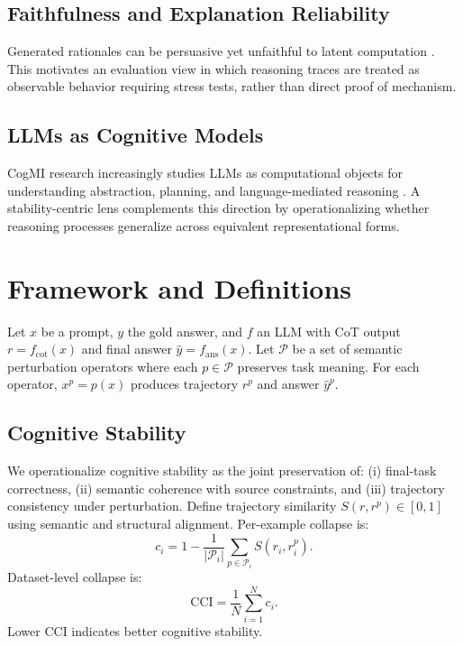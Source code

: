\documentclass[conference]{IEEEtran}
\begin{document}
\subsection{Faithfulness and Explanation Reliability}
Generated rationales can be persuasive yet unfaithful to latent computation \cite{turpin2023unfaithful,lanham2023faithful}. This motivates an evaluation view in which reasoning traces are treated as observable behavior requiring stress tests, rather than direct proof of mechanism.

\subsection{LLMs as Cognitive Models}
CogMI research increasingly studies LLMs as computational objects for understanding abstraction, planning, and language-mediated reasoning \cite{binz2023using,bubeck2023sparks}. A stability-centric lens complements this direction by operationalizing whether reasoning processes generalize across equivalent representational forms.

\section{Framework and Definitions}
Let $x$ be a prompt, $y$ the gold answer, and $f$ an LLM with CoT output $r=f_{\mathrm{cot}}(x)$ and final answer $\hat{y}=f_{\mathrm{ans}}(x)$. Let $\mathcal{P}$ be a set of semantic perturbation operators where each $p\in\mathcal{P}$ preserves task meaning. For each operator, $x^p=p(x)$ produces trajectory $r^p$ and answer $\hat{y}^p$.

\subsection{Cognitive Stability}
We operationalize cognitive stability as the joint preservation of: (i) final-task correctness, (ii) semantic coherence with source constraints, and (iii) trajectory consistency under perturbation. Define trajectory similarity $S(r,r^p)\in[0,1]$ using semantic and structural alignment. Per-example collapse is:
\begin{equation}
 c_i = 1 - \frac{1}{|\mathcal{P}_i|}\sum_{p\in\mathcal{P}_i} S(r_i,r_i^p).
\end{equation}
Dataset-level collapse is:
\begin{equation}
 \mathrm{CCI}=\frac{1}{N}\sum_{i=1}^{N} c_i.
\end{equation}
Lower CCI indicates better cognitive stability.
\end{document}

